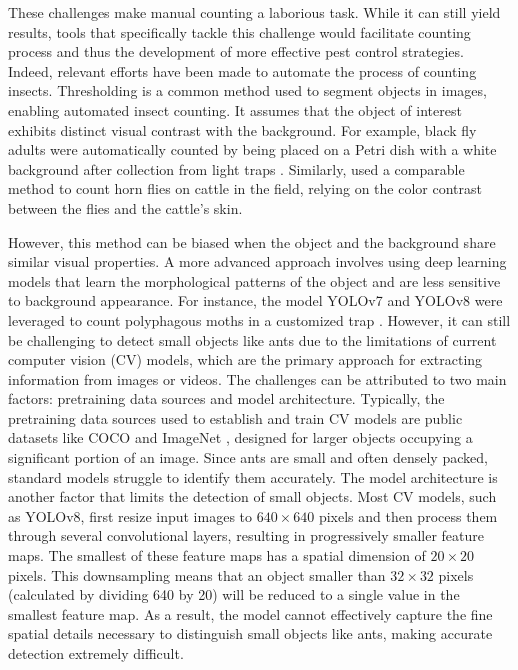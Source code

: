 These challenges make manual counting a laborious task. While it can still yield results, tools that specifically tackle this challenge would facilitate counting process and thus the development of more effective pest control strategies. Indeed, relevant efforts have been made to automate the process of counting insects. Thresholding is a common method used to segment objects in images, enabling automated insect counting. It assumes that the object of interest exhibits distinct visual contrast with the background. For example, black fly adults were automatically counted by being placed on a Petri dish with a white background after collection from light traps \cite{Parker2020Using}. Similarly, \cite{Smythe2020Using} used a comparable method to count horn flies on cattle in the field, relying on the color contrast between the flies and the cattle’s skin.  
    
However, this method can be biased when the object and the background share similar visual properties. A more advanced approach involves using deep learning models that learn the morphological patterns of the object and are less sensitive to background appearance. For instance, the model YOLOv7 \cite{Wang2022YOLOv7} and YOLOv8 \cite{Jocher2023YOLO,Terven2023Comprehensive} were leveraged to count polyphagous moths in a customized trap \cite{Saradopoulos2023Image}. However, it can still be challenging to detect small objects like ants due to the limitations of current computer vision (CV) models, which are the primary approach for extracting information from images or videos. The challenges can be attributed to two main factors: pretraining data sources and model architecture. Typically, the pretraining data sources used to establish and train CV models are public datasets like COCO \cite{Lin2014Microsoft} and ImageNet \cite{Deng2009ImageNet}, designed for larger objects occupying a significant portion of an image. Since ants are small and often densely packed, standard models struggle to identify them accurately. The model architecture is another factor that limits the detection of small objects. Most CV models, such as YOLOv8, first resize input images to $640 \times 640$ pixels and then process them through several convolutional layers, resulting in progressively smaller feature maps. The smallest of these feature maps has a spatial dimension of $20 \times 20$ pixels. This downsampling means that an object smaller than $32 \times 32$ pixels (calculated by dividing 640 by 20) will be reduced to a single value in the smallest feature map. As a result, the model cannot effectively capture the fine spatial details necessary to distinguish small objects like ants, making accurate detection extremely difficult. 
    

